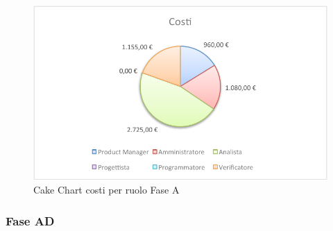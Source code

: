 				\begin{figure}[H]\centering
					\includegraphics[width=\textwidth]{PianoDiProgetto/Pics/ChartTotCostiFaseA.pdf}
					\caption{Cake Chart costi per ruolo Fase A}
				\end{figure}
		\subsubsection{Fase AD}
